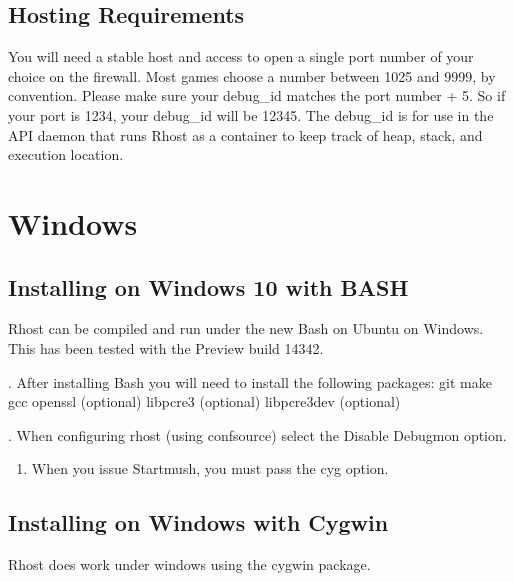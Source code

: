 \documentclass[letterpaper,10pt,english]{sphinxmanual}
\begin{document}
\section{Hosting Requirements}
\label{\detokenize{requirements:hosting-requirements}}
\sphinxAtStartPar
You will need a stable host and access to open a single port number of your choice on the firewall.  Most games choose a number between 1025 and 9999, by convention.  Please make sure your debug\_id matches the port number + 5.  So if your port is 1234, your debug\_id will be 12345.  The debug\_id is for use in the API daemon that runs Rhost as a container to keep track of heap, stack, and execution location.


\chapter{Windows}
\label{\detokenize{windows:windows}}\label{\detokenize{windows:id1}}\label{\detokenize{windows::doc}}

\section{Installing on Windows 10 with BASH}
\label{\detokenize{windows:installing-on-windows-10-with-bash}}
\sphinxAtStartPar
Rhost can be compiled and run under the new Bash on Ubuntu on Windows.
This has been tested with the Preview build 14342.

. After installing Bash you will need to install the following packages:
git
make
gcc
openssl (optional)
libpcre3 (optional)
libpcre3\sphinxhyphen{}dev (optional)

. When configuring rhost (using confsource) select the Disable Debugmon
option.
\begin{enumerate}
%
\setcounter{enumi}{2}
\item {} 
\sphinxAtStartPar
When you issue Startmush, you must pass the \sphinxhyphen{}cyg option.

\end{enumerate}


\section{Installing on Windows with Cygwin}
\label{\detokenize{windows:installing-on-windows-with-cygwin}}
\sphinxAtStartPar
Rhost does work under windows using the cygwin package.
\end{document}
